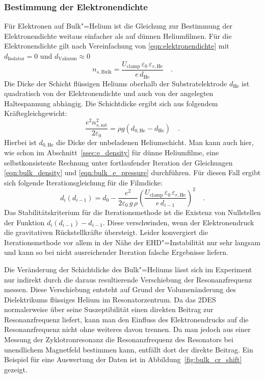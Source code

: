 \subsubsection{Bestimmung der Elektronendichte}
\label{ssec:e_density_bulk}

Für Elektronen auf Bulk"=Helium ist die Gleichung zur Bestimmung der Elektronendichte weitaus einfacher als auf dünnen Heliumfilmen. Für die Elektronendichte gilt nach Vereinfachung von \eqref{eqn:elektronendichte} mit $d_\text{Isolator}=0$ und $d_\text{Vakuum}\approx0$
\begin{equation}
	n_{s,\text{Bulk}}=\frac{U_\text{clamp}\,\varepsilon_0\,\varepsilon_{r,\text{He}}}
		{e\,d_\text{He}}\quad.
		\label{eqn:bulk_density}
\end{equation}
Die Dicke der Schicht flüssigen Heliums oberhalb der Substratelektrode $d_\text{He}$ ist quadratisch von der Elektronendichte und auch von der angelegten Haltespannung abhängig. Die Schichtdicke ergibt sich aus folgendem Kräftegleichgewicht:
\begin{equation}
	\frac{e^2 n_{s,\text{sat}}^2}{2\varepsilon_0}=\rho g \left(d_{0,\text{He}}-d_\text{He}\right)\quad.
	\label{eqn:bulk_e_pressure}
\end{equation}
Hierbei ist $d_{0,\text{He}}$ die Dicke der unbeladenen Heliumschicht.
Man kann auch hier, wie schon im Abschnitt~\ref{ssec:e_density} für dünne Heliumfilme, eine selbstkonsistente Rechnung unter fortlaufender Iteration der Gleichungen \eqref{eqn:bulk_density} und \eqref{eqn:bulk_e_pressure} durchführen. Für diesen Fall ergibt sich folgende Iterationsgleichung für die Filmdicke:
\begin{equation}
	d_i(d_{i-1})=d_0-\frac{e^2}{2\varepsilon_0\,g\,\rho}
		\left(\frac{U_\text{clamp}\,\varepsilon_0\,\varepsilon_{r,\text{He}}}
		{e\,d_{i-1}}\right)^2\quad.
\end{equation}
Das Stabilitätskriterium für die Iterationsmethode ist die Existenz von Nullstellen der Funktion $d_i(d_{i-1})-d_{i-1}$. Diese verschwinden, wenn der Elektronendruck die gravitativen Rückstellkräfte übersteigt. Leider konvergiert die Iterationsmethode vor allem in der Nähe der EHD"=Instabilität nur sehr langsam und kann so bei nicht ausreichender Iteration falsche Ergebnisse liefern.

Die Veränderung der Schichtdicke des Bulk"=Heliums lässt sich im Experiment nur indirekt durch die daraus resultierende Verschiebung der Resonanzfrequenz messen. Diese Verschiebung entsteht auf Grund der Volumenänderung des Dielektrikums flüssiges Helium im Resonatorzentrum. Da das 2DES normalerweise über seine Suszeptibilität einen direkten Beitrag zur Resonanzfrequenz liefert, kann man den Einfluss des Elektronendrucks auf die Resonanzfrequenz nicht ohne weiteres davon trennen. Da man jedoch aus einer Messung der Zyklotronresonanz die Resonanzfrequenz des Resonators bei unendlichem Magnetfeld bestimmen kann, entfällt dort der direkte Beitrag. Ein Beispiel für eine Auswertung der Daten ist in Abbildung~\ref{fig:bulk_cr_shift} gezeigt.

